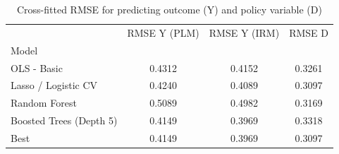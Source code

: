 \begin{table}
\caption{Cross-fitted RMSE for predicting outcome (Y) and policy variable (D)}
\label{tab:rmse_evaluation}
\begin{tabular}{lccc}
\toprule
 & RMSE Y (PLM) & RMSE Y (IRM) & RMSE D \\
Model &  &  &  \\
\midrule
OLS - Basic & 0.4312 & 0.4152 & 0.3261 \\
Lasso / Logistic CV & 0.4240 & 0.4089 & 0.3097 \\
Random Forest & 0.5089 & 0.4982 & 0.3169 \\
Boosted Trees (Depth 5) & 0.4149 & 0.3969 & 0.3318 \\
Best & 0.4149 & 0.3969 & 0.3097 \\
\bottomrule
\end{tabular}
\end{table}
